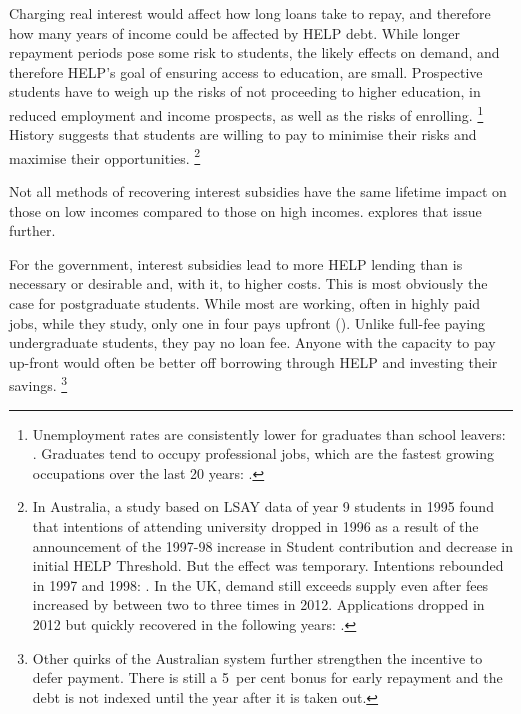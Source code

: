 \documentclass[embargoed]{grattan}
\begin{document}
Charging real interest would affect how long loans take to repay, and therefore how many years of income could be affected by \gls{HELP} debt.
While longer repayment periods pose some risk to students, the likely effects on demand, and therefore \gls{HELP}'s goal of ensuring access to education, are small.
Prospective students have to weigh up the risks of not proceeding to higher education, in reduced employment and income prospects, as well as the risks of enrolling.%
\footnote{Unemployment rates are consistently lower for graduates than school leavers: \textcite[][Table 10]{Norton2016MappingAustralianhigher}.
Graduates tend to occupy professional jobs, which are the fastest growing occupations over the last 20 years: \textcite{ABS2015LabourforceAustralia}.} History suggests that students are willing to pay to minimise their risks and maximise their opportunities.%
\footnote{In Australia, a study based on LSAY data of year 9 students in 1995 found that intentions of attending university dropped in 1996 as a result of the announcement of the 1997-98 increase in \gls{Student contribution} and decrease in initial \gls{HELP} \gls{Threshold}.
But the effect was temporary.
Intentions rebounded in 1997 and 1998: \textcite[][505]{Chapman2005accessimplicationsincome}.
In the UK, demand still exceeds supply even after fees increased by between two to three times in 2012.
Applications dropped in 2012 but quickly recovered in the following years: \textcite[][Figures~4 and~27]{UCAS20152015endcycle}.}

Not all methods of recovering interest subsidies have the same lifetime impact on those on low incomes compared to those on high incomes.
 explores that issue further.

For the government, interest subsidies lead to more \gls{HELP} lending than is necessary or desirable and, with it, to higher costs.
This is most obviously the case for postgraduate students.
While most are working, often in highly paid jobs, while they study, only one in four pays upfront ().
Unlike full-fee paying undergraduate students, they pay no loan fee.
Anyone with the capacity to pay up-front would often be better off borrowing through \gls{HELP} and investing their savings.%
\footnote{Other quirks of the Australian system further strengthen the incentive to defer payment.
There is still a 5~per cent bonus for early repayment and the debt is not indexed until the year after it is taken out.}
\end{document}

